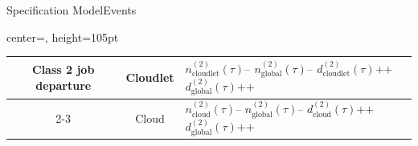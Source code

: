 \documentclass[10pt]{beamer}
\begin{document}
\begin{frame}{Specification Model}{Events}
\begin{table}[h!]
\begin{adjustbox}{center=\textwidth, height=105pt}
\begin{tabular}{c|c|p{2.5cm}}
      \multirow{8}{*}{Class 2 job departure} & \multirow{4}{*}{Cloudlet} & $n_{\text{cloudlet}}^{(2)}(\tau)\texttt{--}$ \newline $n_{\text{global}}^{(2)}(\tau)\texttt{--}$ \newline $d_{\text{cloudlet}}^{(2)}(\tau)\texttt{++}$ \newline $d_{\text{global}}^{(2)}(\tau)\texttt{++}$ \\ \cline{2-3} 
      & \multirow{4}{*}{Cloud} & $n_{\text{cloud}}^{(2)}(\tau)\texttt{--}$ \newline $n_{\text{global}}^{(2)}(\tau)\texttt{--}$ \newline $d_{\text{cloud}}^{(2)}(\tau)\texttt{++}$ \newline $d_{\text{global}}^{(2)}(\tau)\texttt{++}$ \\
 
      \bottomrule


    \end{tabular}
    \end{adjustbox}
\end{table}

\end{frame}
\end{document}
